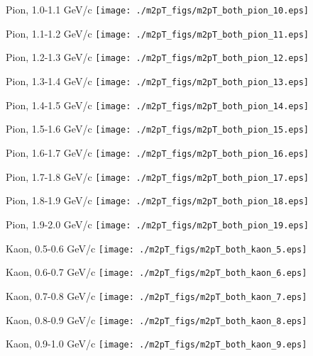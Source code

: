 \documentclass[compress]{beamer} %
\begin{document}
\begin{frame}{Pion, 1.0-1.1 GeV/c}
\texttt{[image: ./m2pT\_figs/m2pT\_both\_pion\_10.eps]}
\end{frame}
\begin{frame}{Pion, 1.1-1.2 GeV/c}
\texttt{[image: ./m2pT\_figs/m2pT\_both\_pion\_11.eps]}
\end{frame}
\begin{frame}{Pion, 1.2-1.3 GeV/c}
\texttt{[image: ./m2pT\_figs/m2pT\_both\_pion\_12.eps]}
\end{frame}
\begin{frame}{Pion, 1.3-1.4 GeV/c}
\texttt{[image: ./m2pT\_figs/m2pT\_both\_pion\_13.eps]}
\end{frame}
\begin{frame}{Pion, 1.4-1.5 GeV/c}
\texttt{[image: ./m2pT\_figs/m2pT\_both\_pion\_14.eps]}
\end{frame}
\begin{frame}{Pion, 1.5-1.6 GeV/c}
\texttt{[image: ./m2pT\_figs/m2pT\_both\_pion\_15.eps]}
\end{frame}
\begin{frame}{Pion, 1.6-1.7 GeV/c}
\texttt{[image: ./m2pT\_figs/m2pT\_both\_pion\_16.eps]}
\end{frame}
\begin{frame}{Pion, 1.7-1.8 GeV/c}
\texttt{[image: ./m2pT\_figs/m2pT\_both\_pion\_17.eps]}
\end{frame}
\begin{frame}{Pion, 1.8-1.9 GeV/c}
\texttt{[image: ./m2pT\_figs/m2pT\_both\_pion\_18.eps]}
\end{frame}
\begin{frame}{Pion, 1.9-2.0 GeV/c}
\texttt{[image: ./m2pT\_figs/m2pT\_both\_pion\_19.eps]}
\end{frame}









\begin{frame}{Kaon, 0.5-0.6 GeV/c}
\texttt{[image: ./m2pT\_figs/m2pT\_both\_kaon\_5.eps]}
\end{frame}
\begin{frame}{Kaon, 0.6-0.7 GeV/c}
\texttt{[image: ./m2pT\_figs/m2pT\_both\_kaon\_6.eps]}
\end{frame}
\begin{frame}{Kaon, 0.7-0.8 GeV/c}
\texttt{[image: ./m2pT\_figs/m2pT\_both\_kaon\_7.eps]}
\end{frame}
\begin{frame}{Kaon, 0.8-0.9 GeV/c}
\texttt{[image: ./m2pT\_figs/m2pT\_both\_kaon\_8.eps]}
\end{frame}
\begin{frame}{Kaon, 0.9-1.0 GeV/c}
\texttt{[image: ./m2pT\_figs/m2pT\_both\_kaon\_9.eps]}
\end{frame}
\end{document}
